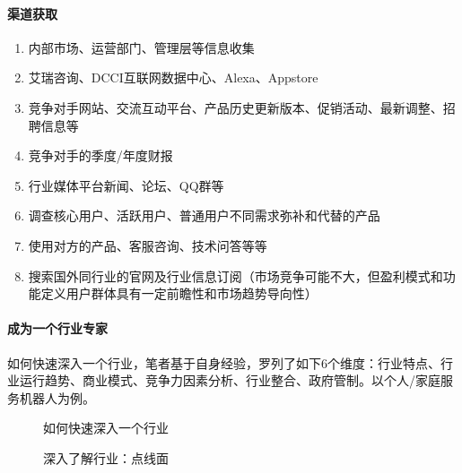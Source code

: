 \documentclass[letterpaper,11pt,english]{sphinxmanual}
\begin{document}
\paragraph{渠道获取}
\label{\detokenize{chapter_skill/industry_analysis:id10}}\begin{enumerate}
%
\item {} 
内部市场、运营部门、管理层等信息收集

\item {} 
艾瑞咨询、DCCI互联网数据中心、Alexa、Appstore

\item {} 
竞争对手网站、交流互动平台、产品历史更新版本、促销活动、最新调整、招聘信息等

\item {} 
竞争对手的季度/年度财报

\item {} 
行业媒体平台新闻、论坛、QQ群等

\item {} 
调查核心用户、活跃用户、普通用户不同需求弥补和代替的产品

\item {} 
使用对方的产品、客服咨询、技术问答等等

\item {} 
搜索国外同行业的官网及行业信息订阅（市场竞争可能不大，但盈利模式和功能定义用户群体具有一定前瞻性和市场趋势导向性）

\end{enumerate}


\paragraph{成为一个行业专家}
\label{\detokenize{chapter_skill/industry_analysis:id11}}
如何快速深入一个行业，笔者基于自身经验，罗列了如下6个维度：行业特点、行业运行趋势、商业模式、竞争力因素分析、行业整合、政府管制。以个人/家庭服务机器人为例。

\begin{figure}[H]
\centering
\capstart

\noindent{}
\caption{如何快速深入一个行业}\label{\detokenize{chapter_skill/industry_analysis:id15}}\end{figure}

\begin{figure}[H]
\centering
\capstart

\noindent{}
\caption{深入了解行业：点线面}\label{\detokenize{chapter_skill/industry_analysis:id16}}\end{figure}
\end{document}
